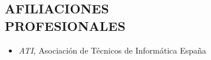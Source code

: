 \documentclass[line,margin]{res}
\begin{document}
\begin{resume}
\section{AFILIACIONES \\PROFESIONALES\\}
               \begin{itemize}  \itemsep 2pt %
               \item \textit{ATI,} Asociaci\'{o}n de T\'{e}cnicos de Inform\'{a}tica \hfill Espa\~{n}a
               \\
               \\
               \end{itemize}
 
\end{resume}
\end{document}
